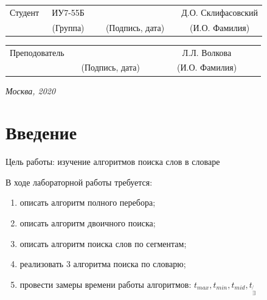 \documentclass[14pt, a4paper]{extarticle}
\begin{document}
\noindent
{}
\\

\noindent
{}
\\

\vspace{1.5cm}
\noindent
\begin{tabular}{l c c c c c}
	Студент      & ~ИУ7-55Б~               & \hspace{2.5cm} & \hspace{2cm}                 & &  Д.О. Склифасовский \\\cline{2-2}\cline{4-4} \cline{6-6} 
	\hspace{3cm} & {\footnotesize(Группа)} &                & {\footnotesize(Подпись, дата)} & & {\footnotesize(И.О. Фамилия)}
\end{tabular}

\noindent
\begin{tabular}{l c c c c}
	Преподователь & \hspace{5cm}   & \hspace{2cm}                 & & ~~~~~~Л.Л. Волкова~~~~~~\\\cline{3-3} \cline{5-5} 
	\hspace{3cm}  &                & {\footnotesize(Подпись, дата)} & & {\footnotesize(И.О. Фамилия)}
\end{tabular}

\vspace{0.6cm}
\begin{center}	
	\vfill
	\large \textit {Москва, 2020}
\end{center}

\thispagestyle {empty}
\pagebreak

\clearpage
\tableofcontents

\clearpage
\section*{Введение}
Цель работы: изучение алгоритмов поиска слов в словаре\par
В ходе лабораторной работы требуется:
\begin{enumerate}
	\item[1)] описать алгоритм полного перебора;
	\item[2)] описать алгоритм двоичного поиска;
	\item[3)] описать алгоритм поиска слов по сегментам;
	\item[4)] реализовать 3 алгоритма поиска по словарю;
	\item[5)] провести замеры времени работы алгоритмов: $t_{max}, t_{min}, t_{mid}, t_{\not{\exists}}$
\end{enumerate}\par
\end{document}
